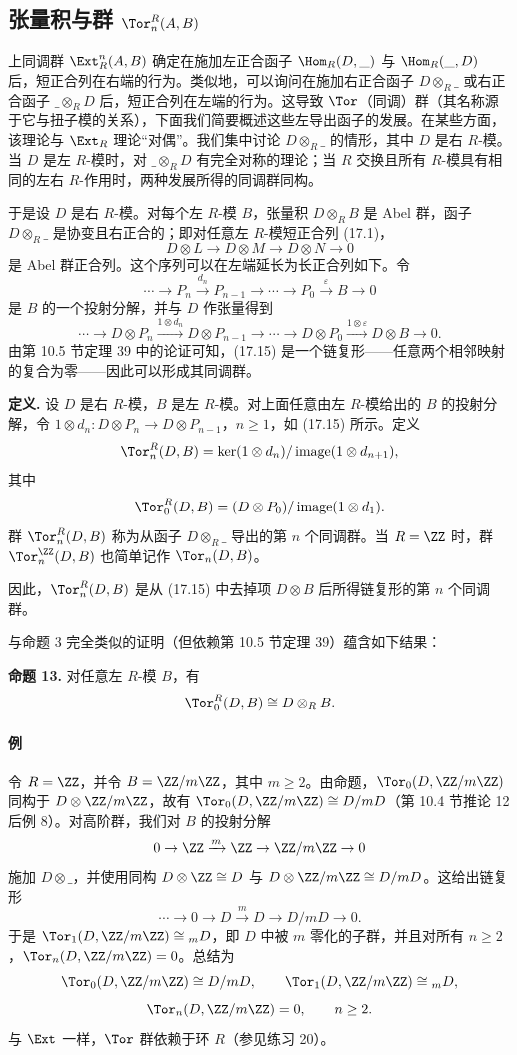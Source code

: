 \subsection*{张量积与群 $\Tor_n^R(A,B)$}

上同调群 $\Ext_R^n(A,B)$ 确定在施加左正合函子 $\Hom_R(D,\_)$ 与 $\Hom_R(\_,D)$ 后，短正合列在右端的行为。类似地，可以询问在施加右正合函子 $D\otimes_R\_$ 或右正合函子 $\_\otimes_R D$ 后，短正合列在左端的行为。这导致 $\Tor$（同调）群（其名称源于它与扭子模的关系），下面我们简要概述这些左导出函子的发展。在某些方面，该理论与 $\Ext_R$ 理论“对偶”。我们集中讨论 $D\otimes_R\_$ 的情形，其中 $D$ 是右 $R$-模。当 $D$ 是左 $R$-模时，对 $\_\otimes_R D$ 有完全对称的理论；当 $R$ 交换且所有 $R$-模具有相同的左右 $R$-作用时，两种发展所得的同调群同构。

于是设 $D$ 是右 $R$-模。对每个左 $R$-模 $B$，张量积 $D\otimes_R B$ 是 Abel 群，函子 $D\otimes_R\_$ 是协变且右正合的；即对任意左 $R$-模短正合列 (17.1)，
\[
  D\otimes L\to D\otimes M\to D\otimes N\to0
\]
是 Abel 群正合列。这个序列可以在左端延长为长正合列如下。令
\[
  \cdots\to P_n\xrightarrow{d_n}P_{n-1}\to\cdots\to P_0\xrightarrow{\varepsilon}B\to0
\]
是 $B$ 的一个投射分解，并与 $D$ 作张量得到
\[
  \cdots\to D\otimes P_n\xrightarrow{1\otimes d_n}D\otimes P_{n-1}\to\cdots\to D\otimes P_0\xrightarrow{1\otimes\varepsilon}D\otimes B\to0.
  \tag{17.15}
\]
由第 10.5 节定理 39 中的论证可知，(17.15) 是一个链复形——任意两个相邻映射的复合为零——因此可以形成其同调群。

\noindent\textbf{定义.} 设 $D$ 是右 $R$-模，$B$ 是左 $R$-模。对上面任意由左 $R$-模给出的 $B$ 的投射分解，令 $1\otimes d_n:D\otimes P_n\to D\otimes P_{n-1}$，$n\geq1$，如 (17.15) 所示。定义
\[
  \Tor_n^R(D,B)=\ker(1\otimes d_n)/\operatorname{image}(1\otimes d_{n+1}),
\]
其中
\[
  \Tor_0^R(D,B)=(D\otimes P_0)/\operatorname{image}(1\otimes d_1).
\]
群 $\Tor_n^R(D,B)$ 称为从函子 $D\otimes_R\_$ 导出的第 $n$ 个同调群。当 $R=\ZZ$ 时，群 $\Tor_n^{\ZZ}(D,B)$ 也简单记作 $\Tor_n(D,B)$。

因此，$\Tor_n^R(D,B)$ 是从 (17.15) 中去掉项 $D\otimes B$ 后所得链复形的第 $n$ 个同调群。

与命题 3 完全类似的证明（但依赖第 10.5 节定理 39）蕴含如下结果：

\medskip
\noindent\textbf{命题 13.} 对任意左 $R$-模 $B$，有
\[
  \Tor_0^R(D,B)\cong D\otimes_R B.
\]

\paragraph{例}
令 $R=\ZZ$，并令 $B=\ZZ/m\ZZ$，其中 $m\geq2$。由命题，$\Tor_0(D,\ZZ/m\ZZ)$ 同构于 $D\otimes\ZZ/m\ZZ$，故有 $\Tor_0(D,\ZZ/m\ZZ)\cong D/mD$（第 10.4 节推论 12 后例 8）。对高阶群，我们对 $B$ 的投射分解
\[
  0\to\ZZ\xrightarrow{m}\ZZ\to\ZZ/m\ZZ\to0
\]
施加 $D\otimes\_$，并使用同构 $D\otimes\ZZ\cong D$ 与 $D\otimes\ZZ/m\ZZ\cong D/mD$。这给出链复形
\[
  \cdots\to0\to D\xrightarrow{m}D\to D/mD\to0.
\]
于是 $\Tor_1(D,\ZZ/m\ZZ)\cong {}_mD$，即 $D$ 中被 $m$ 零化的子群，并且对所有 $n\geq2$，$\Tor_n(D,\ZZ/m\ZZ)=0$。总结为
\[
\Tor_0(D,\ZZ/m\ZZ)\cong D/mD,
\qquad
\Tor_1(D,\ZZ/m\ZZ)\cong {}_mD,
\]
\[
\Tor_n(D,\ZZ/m\ZZ)=0,
\qquad n\geq2.
\]
与 $\Ext$ 一样，$\Tor$ 群依赖于环 $R$（参见练习 20）。

